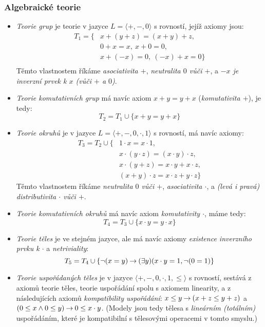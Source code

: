 \subsubsection{Algebraické teorie}

\begin{itemize}
    \item \emph{Teorie grup} je teorie v jazyce $L=\langle +,-,0\rangle$ s rovností, jejíž axiomy jsou:
    \begin{align*}
        T_1=\{& x + (y + z) = (x + y) + z,\\
            & 0 + x = x,\ x + 0 = 0,\\
            & x + (-x) = 0,\ (-x) + x = 0\}\\
    \end{align*}
    Těmto vlastnostem říkáme \emph{asociativita $+$}, \emph{neutralita $0$ vůči $+$}, a \emph{$-x$ je inverzní prvek k $x$ (vůči $+$ a $0$)}.
    \item \emph{Teorie komutativních grup} má navíc axiom $x+y=y+x$ (\emph{komutativita $+$}), je tedy: 
    $$
    T_2=T_1\cup\{x+y=y+x\}
    $$
    \item \emph{Teorie okruhů} je v jazyce $L=\langle +,-,0,\cdot,1\rangle$ s rovností, má navíc axiomy:
    \begin{align*}
        T_3=T_2\cup\{   & 1 \cdot x = x \cdot 1,\\
        & x \cdot (y \cdot z) = (x \cdot y) \cdot z,\\
        & x \cdot (y + z) = x \cdot y + x \cdot z,\\
        & (x + y) \cdot z = x \cdot z + y \cdot z\}
    \end{align*}
    Těmto vlastnostem říkáme \emph{neutralita $0$ vůči $+$}, \emph{asociativita $\cdot$}, a \emph{(levá i pravá) distributivita $\cdot$ vůči $+$}.
    \item \emph{Teorie komutativních okruhů} má navíc axiom \emph{komutativity $\cdot$}, máme tedy:
    $$
    T_4 = T_3 \cup \{x \cdot y = y \cdot x\}
    $$
    \item \emph{Teorie těles} je ve stejném jazyce, ale má navíc axiomy \emph{existence inverzního prvku k $\cdot$} a \emph{netriviality}:
    $$
    T_5 = T_4 \cup \{\neg (x=y) \mathbin{\rightarrow} (\exists y)(x\cdot y = 1, \neg (0=1)\}
    $$
    \item \emph{Teorie uspořádaných těles} je v jazyce $\langle +, -, 0,\cdot,1,\leq\rangle$ s rovností, sestává z axiomů teorie těles, teorie uspořádání spolu s axiomem linearity, a z následujících axiomů \emph{kompatibility uspořádání}: $x\leq y\mathbin{\rightarrow} (x+z\leq y+z)$ a $(0\leq x\land 0\leq y)\mathbin{\rightarrow} 0\leq x\cdot y$. (Modely jsou tedy tělesa s \emph{lineárním (totálním)} uspořádáním, které je kompatibilní s tělesovými operacemi v tomto smyslu.)
\end{itemize}


